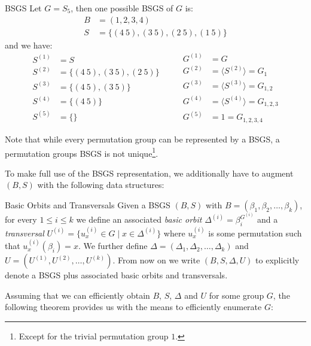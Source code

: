 \begin{exmp}{BSGS}
  Let $G = S_5$, then one possible BSGS of $G$ is:
  \begin{align*}
  B &= (1, 2, 3, 4) \\
  S &= \{(4\ 5), (3\ 5), (2\ 5), (1\ 5)\}
  \end{align*}
  and we have:
  \begin{equation*}
    \begin{split}
      S^{(1)} &= S \\
      S^{(2)} &= \{(4\ 5), (3\ 5), (2\ 5)\} \\
      S^{(3)} &= \{(4\ 5), (3\ 5)\} \\
      S^{(4)} &= \{(4\ 5)\} \\
      S^{(5)} &= \{\}
    \end{split}
    \qquad
    \begin{split}
      G^{(1)} &= G \\
      G^{(2)} &= \langle S^{(2)} \rangle = G_{1}\\
      G^{(3)} &= \langle S^{(3)} \rangle = G_{1,2}\\
      G^{(4)} &= \langle S^{(4)} \rangle = G_{1,2,3}\\
      G^{(5)} &= 1 = G_{1,2,3,4}
    \end{split}
  \end{equation*}
\end{exmp}
%
Note that while every permutation group can be represented by a BSGS, a
permutation groups BSGS is not unique\footnote{Except for the trivial
permutation group $1$.}.

To make full use of the BSGS representation, we additionally have to augment
$(B, S)$ with the following data structures:

\begin{defn}{Basic Orbits and Transversals}
  Given a BSGS $(B, S)$ with $B = (\beta_1, \beta_2, \dots, \beta_k)$, for
  every $1 \leq i \leq k$ we define an associated \textit{basic orbit}
  $\Delta^{(i)} = \beta_i^{G^{(i)}}$ and a \textit{transversal} $U^{(i)} =
  \{u_x^{(i)} \in G \mid x \in \Delta^{(i)}\}$ where $u_x^{(i)}$ is some
  permutation such that $u_x^{(i)}(\beta_i) = x$. We further define $\Delta =
  (\Delta_1, \Delta_2, \dots, \Delta_k)$ and $U = (U^{(1)}, U^{(2)}, \dots,
  U^{(k)})$. From now on we write $(B, S, \Delta, U)$ to explicitly denote a BSGS
  plus associated basic orbits and transversals.
\end{defn}
%
Assuming that we can efficiently obtain $B$, $S$, $\Delta$ and $U$ for some
group $G$, the following theorem provides us with the means to efficiently
enumerate $G$:


